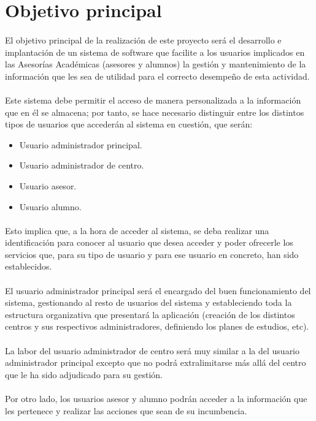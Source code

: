\section{Objetivo principal}

\paragraph{}El objetivo principal de la realización de este proyecto será el
desarrollo e implantación de un sistema de software que facilite a los usuarios
implicados en las Asesorías Académicas (asesores y alumnos) la gestión y
mantenimiento de la información que les sea de utilidad para el correcto
desempeño de esta actividad.

\paragraph{}Este sistema debe permitir el acceso de manera personalizada a la
información que en él se almacena; por tanto, se hace necesario distinguir entre
los distintos tipos de usuarios que accederán al sistema en cuestión, que serán:

\begin{itemize}
 \item Usuario administrador principal.
 \item Usuario administrador de centro.
 \item Usuario asesor.
 \item Usuario alumno.
\end{itemize}

\paragraph{}Esto implica que, a la hora de acceder al sistema, se deba realizar
una identificación para conocer al usuario que desea acceder y poder ofrecerle
los servicios que, para su tipo de usuario y para ese usuario en concreto, han
sido establecidos.

\paragraph{}El usuario administrador principal será el encargado del buen
funcionamiento del sistema, gestionando al resto de usuarios del sistema y
estableciendo toda la estructura organizativa que presentará la aplicación
(creación de los distintos centros y sus respectivos administradores, definiendo
los planes de estudios, etc).

\paragraph{}La labor del usuario administrador de centro será muy similar a la
del usuario administrador principal excepto que no podrá extralimitarse más
allá del centro que le ha sido adjudicado para su gestión.

\paragraph{}Por otro lado, los usuarios asesor y alumno podrán acceder a la
información que les pertenece y realizar las acciones que sean de su
incumbencia.